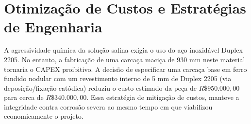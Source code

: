\section{Otimização de Custos e Estratégias de Engenharia}
\label{sec:otimizacao}

A agressividade química da solução salina exigia o uso do aço inoxidável Duplex 2205. No entanto, a fabricação de uma carcaça maciça de 930 mm neste material tornaria o CAPEX proibitivo. A decisão de especificar uma carcaça base em ferro fundido nodular com um revestimento interno de 5 mm de Duplex 2205 (via deposição/fixação catódica) reduziu o custo estimado da peça de \(R\$ 950.000,00\) para cerca de \(R\$ 340.000,00\). Essa estratégia de mitigação de custos, manteve a integridade contra corrosão severa ao mesmo tempo em que viabilizou economicamente o projeto.

